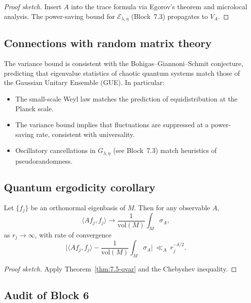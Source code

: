 \begin{proof}[Proof sketch]
Insert $A$ into the trace formula via Egorov’s theorem and microlocal analysis.  
The power-saving bound for $\mathcal{E}_{\lambda,\eta}$ (Block~7.3) propagates to $V_A$.
\end{proof}

\subsection{Connections with random matrix theory} \label{subsec:7.5-rmt}

The variance bound is consistent with the Bohigas–Giannoni–Schmit conjecture, predicting that eigenvalue statistics
of chaotic quantum systems match those of the Gaussian Unitary Ensemble (GUE).  
In particular:
\begin{itemize}
  \item The small-scale Weyl law matches the prediction of equidistribution at the Planck scale.
  \item The variance bound implies that fluctuations are suppressed at a power-saving rate,
  consistent with universality.
  \item Oscillatory cancellations in $G_{\lambda,\eta}$ (see Block~7.3) match heuristics of pseudorandomness.
\end{itemize}

\subsection{Quantum ergodicity corollary} \label{subsec:7.5-qe}

\begin{corollary} \label{cor:7.5-qe}
Let $\{f_j\}$ be an orthonormal eigenbasis of $M$.  
Then for any observable $A$,
\[
  \langle A f_j, f_j \rangle \to \frac{1}{\mathrm{vol}(M)}\int_M \sigma_A,
\]
as $r_j\to\infty$, with rate of convergence
\[
  \Big| \langle A f_j, f_j \rangle - \frac{1}{\mathrm{vol}(M)}\int_M \sigma_A \Big|
  \ \ll_A\ r_j^{-\delta/2}.
\]
\end{corollary}

\begin{proof}[Proof sketch]
Apply Theorem~\ref{thm:7.5-qvar} and the Chebyshev inequality.
\end{proof}

\subsection{Audit of Block 6} \label{subsec:7.5-audit}


